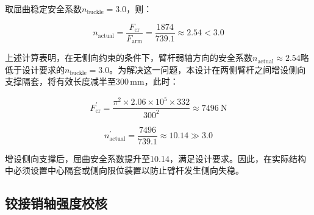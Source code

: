{{取屈曲稳定安全系数$n_{\text{buckle}} = 3.0$，则：

\begin{equation}
    n_{\text{actual}} = \frac{F_{\text{cr}}}{F_{\text{arm}}} = \frac{1874}{739.1} \approx 2.54 < 3.0
    \label{eq:n_buckle}
\end{equation}

上述计算表明，在无侧向约束的条件下，臂杆弱轴方向的安全系数$n_{\text{actual}} \approx 2.54$略低于设计要求的$n_{\text{buckle}} = 3.0$。为解决这一问题，本设计在两侧臂杆之间增设侧向支撑隔套，将有效长度减半至$300$\,mm，此时：

\begin{equation}
    F_{\text{cr}}^{\prime} = \frac{\pi^{2} \times 2.06 \times 10^{5} \times 332}{300^{2}} \approx 7496\ \text{N}
\end{equation}

\begin{equation}
    n_{\text{actual}}^{\prime} = \frac{7496}{739.1} \approx 10.14 \gg 3.0
    \label{eq:n_buckle_braced}
\end{equation}

增设侧向支撑后，屈曲安全系数提升至10.14，满足设计要求。因此，在实际结构中必须设置中心隔套或侧向限位装置以防止臂杆发生侧向失稳。}

\subsection{铰接销轴强度校核}

}
